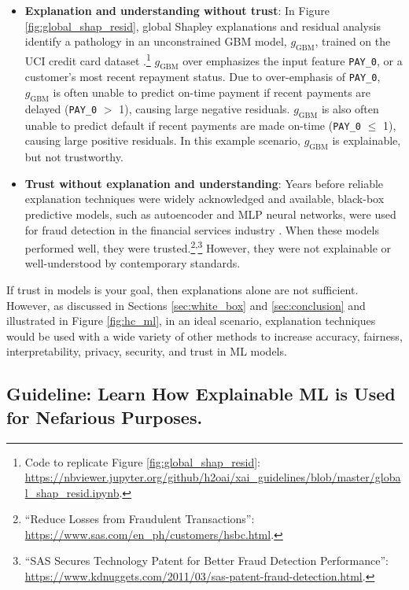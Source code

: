 \documentclass{article}
\begin{document}
\begin{itemize}

\item \textbf{Explanation and understanding without trust}: In Figure \ref{fig:global_shap_resid}, global Shapley explanations and residual analysis identify a pathology in an unconstrained GBM model, $g_{\text{GBM}}$, trained on the UCI credit card dataset \cite{uci}.\footnote{Code to replicate Figure \ref{fig:global_shap_resid}: \url{https://nbviewer.jupyter.org/github/h2oai/xai_guidelines/blob/master/global_shap_resid.ipynb}.} $g_{\text{GBM}}$ over emphasizes the input feature \texttt{PAY\_0}, or a customer's most recent repayment status. Due to over-emphasis of \texttt{PAY\_0}, $g_{\text{GBM}}$ is often unable to predict on-time payment if recent payments are delayed (\texttt{PAY\_0} $>$ 1), causing large negative residuals. $g_{\text{GBM}}$ is also often unable to predict default if recent payments are made on-time (\texttt{PAY\_0} $\leq$ 1), causing large positive residuals. In this example scenario, $g_{\text{GBM}}$ is explainable, but not trustworthy. 

\item \textbf{Trust without explanation and understanding}: Years before reliable explanation techniques were widely acknowledged and available, black-box predictive models, such as autoencoder and MLP neural networks, were used for fraud detection in the financial services industry \cite{gopinathan1998fraud}. When these models performed well, they were trusted.\footnote{``Reduce Losses from Fraudulent Transactions'': \url{https://www.sas.com/en_ph/customers/hsbc.html}.}\textsuperscript{,}\footnote{``SAS Secures Technology Patent for Better Fraud Detection Performance'': \url{https://www.kdnuggets.com/2011/03/sas-patent-fraud-detection.html}.} However, they were not explainable or well-understood by contemporary standards.  

\end{itemize}

If trust in models is your goal, then explanations alone are not sufficient. However, as discussed in Sections \ref{sec:white_box} and \ref{sec:conclusion} and illustrated in Figure \ref{fig:hc_ml}, in an ideal scenario, explanation techniques would be used with a wide variety of other methods to increase accuracy, fairness, interpretability, privacy, security, and trust in ML models. 

\subsection{Guideline: Learn How Explainable ML is Used for Nefarious Purposes.}
\end{document}
